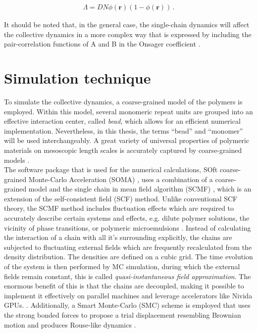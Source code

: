 \documentclass[bachelor,       %
               twoside,        %
               BCOR10mm,       %
                ngerman,english  %
               ]{GAUBM}
\begin{document}
\begin{align}
  \Lambda=DN\phi(\mathbf{r})(1-\phi(\mathbf{r}))\,.
  \label{eq:onsager}
\end{align}


It should be noted that, in the general case, the single-chain dynamics will affect the collective dynamics in a more complex way that is expressed by including the pair-correlation functions of A and B in the Onsager coefficient \cite{Reister02}. 

\chapter{Simulation technique}

To simulate the collective dynamics, a coarse-grained model of the polymers is employed. Within this model, several monomeric repeat units are grouped into an effective interaction center, called \textit{bead}, which allows for an efficient numerical implementation. Nevertheless, in this thesis, the terms \enquote{bead} and \enquote{monomer} will be used interchangeably. A great variety of universal properties of polymeric materials on mesoscopic length scales is accurately captured by coarse-grained models \cite{Baschnagel03}.\\
The software package that is used for the numerical calculations, SOft coarse-grained Monte-Carlo Acceleration (SOMA) \cite{Schneider_soma}, uses a combination of a coarse-grained model and the single chain in mean field algorithm (SCMF) \cite{Daoulas06}, which is an extension of the self-consistent field (SCF) method. Unlike conventional SCF theory, the SCMF method includes fluctuation effects which are required to accurately describe certain systems and effects, e.g. dilute polymer solutions, the vicinity of phase transitions, or polymeric microemulsions \cite{Bates97, Mueller02, Schmid03}. Instead of calculating the interaction of a chain with all it's surrounding explicitly, the chains are subjected to fluctuating external fields which are frequently recalculated from the density distribution. The densities are defined on a cubic grid. The time evolution of the system is then performed by MC simulation, during which the external fields remain constant, this is called \textit{quasi-instantaneous field approximation}. The enormous benefit of this is that the chains are decoupled, making it possible to implement it effectively on parallel machines and leverage accelerators like Nivida GPUs. \cite{Schneider_soma}. Additionally, a Smart Monte-Carlo (SMC) scheme is employed that uses the strong bonded forces to propose a trial displacement resembling Brownian motion and produces Rouse-like dynamics \cite{Pangali78,Rossky78}.\\
\end{document}
